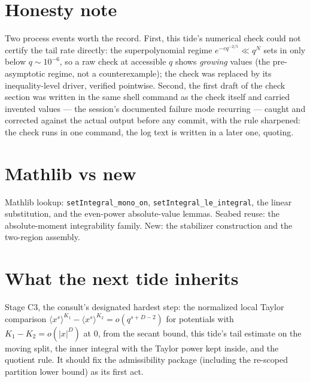 \documentclass[11pt]{article}
\begin{document}
\section{Honesty note}

Two process events worth the record. First, this tide's numerical
check could not certify the tail rate directly: the superpolynomial
regime $e^{-c q^{-2/5}} \ll q^N$ sets in only below
$q \sim 10^{-6}$, so a raw check at accessible $q$ shows
\emph{growing} values (the pre-asymptotic regime, not a
counterexample); the check was replaced by its inequality-level
driver, verified pointwise. Second, the first draft of the check
section was written in the same shell command as the check itself and
carried invented values --- the session's documented failure mode
recurring --- caught and corrected against the actual output before
any commit, with the rule sharpened: the check runs in one command,
the log text is written in a later one, quoting.

\section{Mathlib vs new}

Mathlib lookup: \texttt{setIntegral\_mono\_on},
\texttt{setIntegral\_le\_integral}, the linear substitution, and the
even-power absolute-value lemmas. Seabed reuse: the absolute-moment
integrability family. New: the stabilizer construction and the
two-region assembly.

\section{What the next tide inherits}

Stage C3, the consult's designated hardest step: the normalized local
Taylor comparison
$\langle x^s\rangle^{K_1} - \langle x^s\rangle^{K_2} = o(q^{s+D-2})$
for potentials with $K_1 - K_2 = o(|x|^D)$ at $0$, from the secant
bound, this tide's tail estimate on the moving split, the inner
integral with the Taylor power kept inside, and the quotient rule.
It should fix the admissibility package (including the re-scoped
partition lower bound) as its first act.
\end{document}
